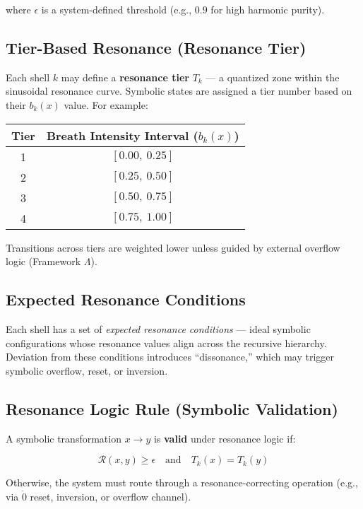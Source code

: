 where $\epsilon$ is a system-defined threshold (e.g., $0.9$ for high harmonic purity).

\subsection*{Tier-Based Resonance (Resonance Tier)}

Each shell $k$ may define a \textbf{resonance tier} $T_k$ — a quantized zone within the sinusoidal resonance curve. Symbolic states are assigned a tier number based on their $b_k(x)$ value. For example:

\begin{center}
\begin{tabular}{|c|c|}
\hline
\textbf{Tier} & \textbf{Breath Intensity Interval ($b_k(x)$)} \\
\hline
1 & $[0.00,\ 0.25]$ \\
2 & $[0.25,\ 0.50]$ \\
3 & $[0.50,\ 0.75]$ \\
4 & $[0.75,\ 1.00]$ \\
\hline
\end{tabular}
\end{center}

Transitions across tiers are weighted lower unless guided by external overflow logic (Framework $\Lambda$).

\subsection*{Expected Resonance Conditions}

Each shell has a set of \emph{expected resonance conditions} — ideal symbolic configurations whose resonance values align across the recursive hierarchy. Deviation from these conditions introduces ``dissonance,'' which may trigger symbolic overflow, reset, or inversion.

\subsection*{Resonance Logic Rule (Symbolic Validation)}

A symbolic transformation $x \rightarrow y$ is \textbf{valid} under resonance logic if:

\[
\mathcal{R}(x, y) \geq \epsilon \quad \text{and} \quad T_k(x) = T_k(y)
\]

Otherwise, the system must route through a resonance-correcting operation (e.g., via $\dot{0}$ reset, inversion, or overflow channel).

